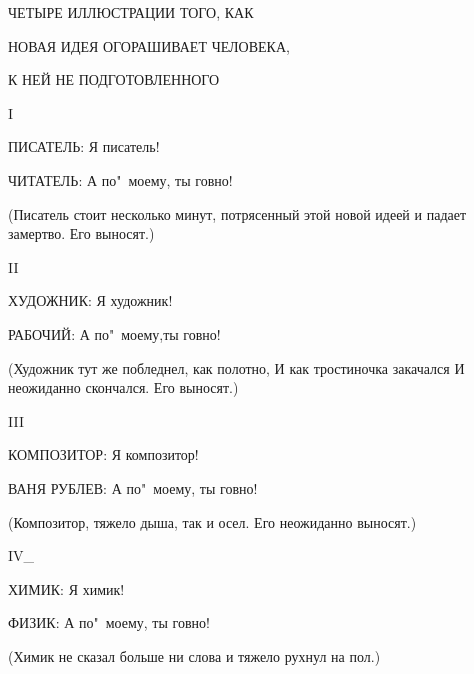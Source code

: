 ЧЕТЫРЕ ИЛЛЮСТРАЦИИ ТОГО, КАК 

    \hspace{0.5cm}
    \parbox{10cm}{НОВАЯ ИДЕЯ ОГОРАШИВАЕТ ЧЕЛОВЕКА,}

    \hspace{1cm}
    \parbox{10cm}{К НЕЙ НЕ ПОДГОТОВЛЕННОГО}

I 

ПИСАТЕЛЬ: Я писатель! 

ЧИТАТЕЛЬ: А по"~моему, ты говно! 

    \hspace{1cm}
    \parbox{10cm}{(Писатель стоит несколько минут,  потрясенный
    этой новой идеей и падает замертво. Его выносят.)}

II

\vspace{0.5cm}

ХУДОЖНИК: Я художник! 

РАБОЧИЙ: А по"~моему,ты говно! 

    \hspace{1cm}
    \parbox{10cm}{(Художник тут же побледнел, как полотно,
    И как тростиночка  закачался 
    И неожиданно скончался.
    Его выносят.)}

\vspace{0.5cm}
    
III 

КОМПОЗИТОР: Я композитор! 

ВАНЯ РУБЛЕВ: А по"~моему, ты говно! 

    \hspace{1cm}
    \parbox[2cm]{10cm}{(Композитор,  тяжело  дыша,  так и осел.
    Его неожиданно выносят.)}

IV\_ 

ХИМИК: Я химик!

ФИЗИК: А по"~моему, ты говно!

    \hspace{1cm}
    \parbox[2cm]{10cm}{(Химик не сказал больше ни слова и 
    тяжело рухнул на пол.)}